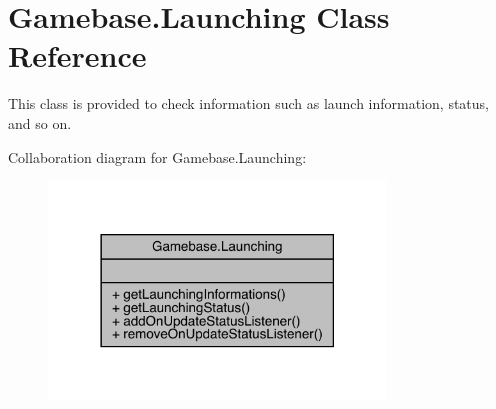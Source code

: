 \hypertarget{classcom_1_1toast_1_1android_1_1gamebase_1_1_gamebase_1_1_launching}{}\section{Gamebase.\+Launching Class Reference}
\label{classcom_1_1toast_1_1android_1_1gamebase_1_1_gamebase_1_1_launching}


This class is provided to check information such as launch information, status, and so on.  




Collaboration diagram for Gamebase.\+Launching\+:\nopagebreak
\begin{figure}[H]
\begin{center}
\leavevmode
\includegraphics[width=254pt]{classcom_1_1toast_1_1android_1_1gamebase_1_1_gamebase_1_1_launching__coll__graph}
\end{center}
\end{figure}
